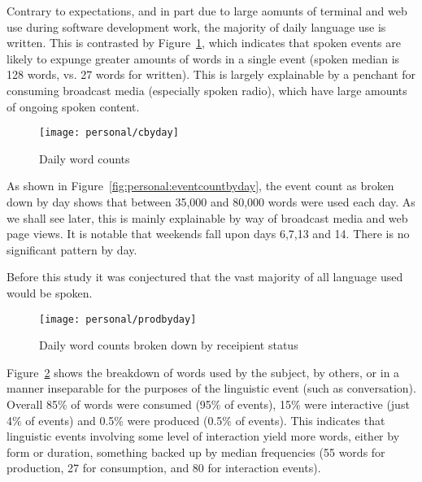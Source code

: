 Contrary to expectations, and in part due to large aomunts of terminal and web use during software development work, the majority of daily language use is written.  This is contrasted by Figure~\ref{fig:personal:wordcountbyday}, which indicates that spoken events are likely to expunge greater amounts of words in a single event (spoken median is 128 words, vs. 27 words for written).  This is largely explainable by a penchant for consuming broadcast media (especially spoken radio), which have large amounts of ongoing spoken content.

% 


\begin{figure}[hp]
    \centering
    \texttt{[image: personal/cbyday]}
    \caption{Daily word counts}
    \label{fig:personal:wordcountbyday}
\end{figure}

As shown in Figure~\ref{fig:personal:eventcountbyday}, the event count as broken down by day shows that between 35,000 and 80,000 words were used each day.  As we shall see later, this is mainly explainable by way of broadcast media and web page views.  It is notable that weekends fall upon days 6,7,13 and 14.  There is no significant pattern by day.

Before this study it was conjectured that the vast majority of all language used would be spoken.


\begin{figure}[hp]
    \centering
    \texttt{[image: personal/prodbyday]}
    \caption{Daily word counts broken down by receipient status}
    \label{fig:personal:prodcountbyday}
\end{figure}

Figure~\ref{fig:personal:prodcountbyday} shows the breakdown of words used by the subject, by others, or in a manner inseparable for the purposes of the linguistic event (such as conversation).  Overall 85\% of words were consumed (95\% of events), 15\% were interactive (just 4\% of events) and 0.5\% were produced (0.5\% of events).  This indicates that linguistic events involving some level of interaction yield more words, either by form or duration, something backed up by median frequencies (55 words for production, 27 for consumption, and 80 for interaction events).







